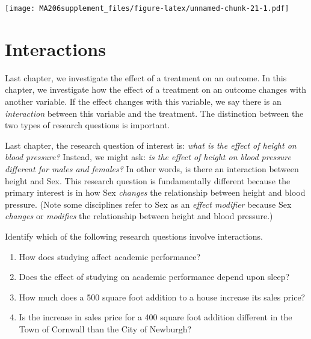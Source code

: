 \documentclass[]{book}
\newenvironment{Shaded}{\begin{snugshade}}{\end{snugshade}}
\newcommand{\KeywordTok}[1]{\textcolor[rgb]{0.13,0.29,0.53}{\textbf{#1}}}
\newcommand{\NormalTok}[1]{#1}
\newcommand{\OperatorTok}[1]{\textcolor[rgb]{0.81,0.36,0.00}{\textbf{#1}}}
\begin{document}
\begin{Shaded}
\end{Shaded}

\texttt{[image: MA206supplement\_files/figure-latex/unnamed-chunk-21-1.pdf]}

\hypertarget{interactions}{%
\chapter{Interactions}\label{interactions}}

Last chapter, we investigate the effect of a treatment on an outcome. In this chapter, we investigate how the effect of a treatment on an outcome changes with another variable. If the effect changes with this variable, we say there is an \emph{interaction} between this variable and the treatment. The distinction between the two types of research questions is important.

Last chapter, the research question of interest is: \emph{what is the effect of height on blood pressure?} Instead, we might ask: \emph{is the effect of height on blood pressure different for males and females?} In other words, is there an interaction between height and Sex. This research question is fundamentally different because the primary interest is in how Sex \emph{changes} the relationship between height and blood pressure. (Note some disciplines refer to Sex as an \emph{effect modifier} because Sex \emph{changes} or \emph{modifies} the relationship between height and blood pressure.)

Identify which of the following research questions involve interactions.

\begin{enumerate}
\def\labelenumi{\alph{enumi})}
\item
  How does studying affect academic performance?
\item
  Does the effect of studying on academic performance depend upon sleep?
\item
  How much does a 500 square foot addition to a house increase its sales price?
\item
  Is the increase in sales price for a 400 square foot addition different in the Town of Cornwall than the City of Newburgh?
\end{enumerate}
\end{document}
